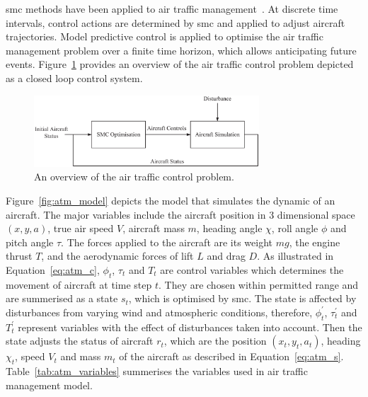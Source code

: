 \gls{smc} methods have been applied to air traffic management~\cite{kantas09,chau13acm,eele13cdc,eele13gnc,lymperopoulos10,lymperopoulos10thesis}.
At discrete time intervals, control actions are determined by \gls{smc} and applied to adjust aircraft trajectories.
Model predictive control is applied to optimise the air traffic management problem over a finite time horizon, which allows anticipating future events.
Figure~\ref{fig:smc_mpc} provides an overview of the air traffic control problem depicted as a closed loop control system.

\begin{figure}[ht]
\begin{center}
\includegraphics[width=0.75\textwidth]{2_background/figures/smc_mpc}
\end{center}
\caption{An overview of the air traffic control problem.}
\label{fig:smc_mpc}
\end{figure}

Figure~\ref{fig:atm_model} depicts the model that simulates the dynamic of an aircraft.
The major variables include the aircraft position in 3 dimensional space $(x,y,a)$, true air speed $V$, aircraft mass $m$, heading angle $\chi$, roll angle $\phi$ and pitch angle $\tau$.
The forces applied to the aircraft are its weight $mg$, the engine thrust $T$, and the aerodynamic forces of lift $L$ and drag $D$.
As illustrated in Equation~\ref{eq:atm_c}, $\phi_t$, $\tau_t$ and $T_t$ are control variables which determines the movement of aircraft at time step $t$.
They are chosen within permitted range and are summerised as a state $s_t$, which is optimised by \gls{smc}.
The state is affected by disturbances from varying wind and atmospheric conditions, therefore, $\phi^{\prime}_t$, $\tau^{\prime}_t$ and $T^{\prime}_t$ represent variables with the effect of disturbances taken into account.
Then the state adjusts the status of aircraft $r_{t}$, which are the position $(x_t, y_t, a_t)$, heading $\chi_t$, speed $V_t$ and mass $m_t$ of the aircraft as described in Equation~\ref{eq:atm_s}.
Table~\ref{tab:atm_variables} summerises the variables used in air traffic management model.

